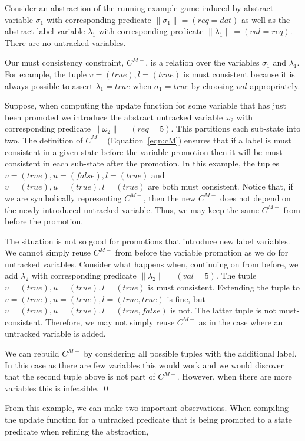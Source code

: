\begin{ex}
    Consider an abstraction of the running example game induced by abstract variable $\sigma_1$ with corresponding predicate $\|\sigma_1\| = (req=dat)$ as well as the abstract label variable $\lambda_1$ with corresponding predicate $\|\lambda_1\| = (val=req)$. There are no untracked variables.

    Our must consistency constraint, $C^{M-}$, is a relation over the variables $\sigma_1$ and $\lambda_1$. For example, the tuple $v=(true), l=(true)$ is must consistent because it is always possible to assert $\lambda_1=true$ when $\sigma_1=true$ by choosing $val$ appropriately.

Suppose, when computing the update function for some variable that has just been promoted we introduce the abstract untracked variable $\omega_2$ with corresponding predicate $\|\omega_2\| = (req=5)$. This partitions each sub-state into two. The definition of $C^{M-}$ (Equation~\ref{eqn:cM}) ensures that if a label is must consistent in a given state before the variable promotion then it will be must consistent in each sub-state after the promotion. In this example, the tuples $v=(true), u=(false), l=(true)$ and $v=(true), u=(true), l=(true)$ are both must consistent. Notice that, if we are symbolically representing $C^{M-}$, then the new $C^{M-}$ does not depend on the newly introduced untracked variable. Thus, we may keep the same $C^{M-}$ from before the promotion.

    The situation is not so good for promotions that introduce new label variables. We cannot simply reuse $C^{M-}$ from before the variable promotion as we do for untracked variables. Consider what happens when, continuing on from before, we add $\lambda_2$ with corresponding predicate $\|\lambda_2\| = (val=5)$. The tuple $v=(true), u=(true), l=(true)$ is must consistent. Extending the tuple to $v=(true), u=(true), l=(true, true)$ is fine, but $v=(true), u=(true), l=(true, false)$ is not. The latter tuple is not must-consistent. Therefore, we may not simply reuse $C^{M-}$ as in the case where an untracked variable is added. 

    We can rebuild $C^{M-}$ by considering all possible tuples with the additional label. In this case as there are few variables this would work and we would discover that the second tuple above is not part of $C^{M-}$. However, when there are more variables this is infeasible. 
    \qed
\end{ex}

From this example, we can make two important observations. When compiling the update function for a untracked predicate that is being promoted to a state predicate when refining the abstraction, 

